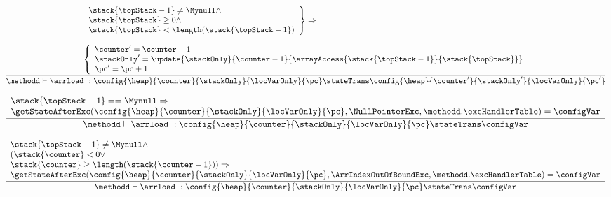 \begin{itemize}
\begin{enumerate}
	     $$ \frac{ \begin{array}{l}
	                      \left.\begin{array}{l}
                                           \stack{\topStack - 1} \neq \Mynull  \wedge \\
					   \stack{\topStack} \geq 0 \wedge  \\
					   \stack{\topStack} < \length (  \stack{\topStack - 1}  )
			            \end{array}\right\}   \Rightarrow \\
			       \\
			       \left\{\begin{array}{l}
			                     \counter' = \counter - 1\\
					     \stackOnly' = \update{\stackOnly}{\counter - 1} { \arrayAccess{ \stack{ \topStack -1 }}{\stack{ \topStack} } } \\
					     \pc'  =  \pc + 1
			              \end{array} \right.
			 \end{array}}
			  {\methodd \vdash  \arrload \ :       \config{\heap}{\counter}{\stackOnly}{\locVarOnly}{\pc} 
						 \stateTrans  
						 \config{\heap}{\counter'}{\stackOnly'}{\locVarOnly}{\pc'}} $$
						 

	  $$ \frac{ \begin{array}{l}
	                      \stack{\topStack - 1} == \Mynull  \Rightarrow \\
			      \getStateAfterExc( \config{\heap}{\counter}{\stackOnly}{\locVarOnly}{\pc} , \NullPointerExc,\methodd.\excHandlerTable ) =  \configVar  \\  
		 \end{array}}
		 {\methodd \vdash  \arrload \ :  \config{\heap}{\counter}{\stackOnly}{\locVarOnly}{\pc} 
			                         \stateTrans  
						 \configVar } $$

                $$   \frac{ \begin{array}{l}   
			      \stack{\topStack - 1} \neq \Mynull  \wedge\\
			      ( \stack{\counter} < 0 	\vee  \\
			       \stack{\counter} \geq \length (  \stack{\counter - 1}  ) ) \Rightarrow \\
			        \getStateAfterExc( \config{\heap}{\counter}{\stackOnly}{\locVarOnly}{\pc}, \ArrIndexOutOfBoundExc ,\methodd.\excHandlerTable ) =  \configVar  
		    \end{array}}
		 {\methodd \vdash  \arrload \ :  \config{\heap}{\counter}{\stackOnly}{\locVarOnly}{\pc} 
			                         \stateTrans  
						 \configVar } $$					 						 
			

\end{enumerate}
\end{itemize}
